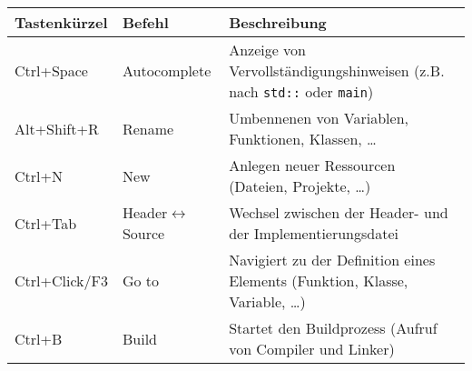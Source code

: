 \begin{tabular}{l|l|p{11.5cm}}
    \toprule
    \textbf{Tastenkürzel} & \textbf{Befehl} & \textbf{Beschreibung}\\
    \midrule
	Ctrl+Space & Autocomplete &
	Anzeige von Vervollständigungshinweisen (z.B. nach \texttt{std::} oder \texttt{main})
	\\
	Alt+Shift+R & Rename &
	Umbennenen von Variablen, Funktionen, Klassen, \dots
	\\
	Ctrl+N & New &
	Anlegen neuer Ressourcen (Dateien, Projekte, \dots)
	\\
	Ctrl+Tab & Header$\leftrightarrow$Source &
	Wechsel zwischen der Header- und der Implementierungsdatei
	\\
	Ctrl+Click/F3 & Go to &
	Navigiert zu der Definition eines Elements (Funktion, Klasse, Variable, \dots)
	\\
	Ctrl+B & Build &
	Startet den Buildprozess (Aufruf von Compiler und Linker)
    \\\bottomrule
\end{tabular}
